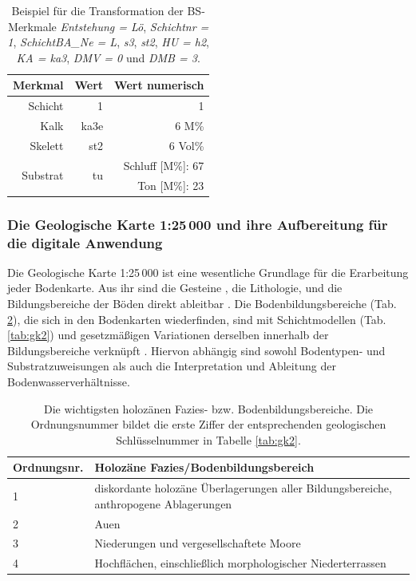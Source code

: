 \begin{table}[H]
  \centering
  \caption{Beispiel für die Transformation der BS-Merkmale  \textit{Entstehung = Lö}, \textit{Schichtnr = 1}, \textit{SchichtBA\_Ne = L}, \textit{s3}, \textit{st2}, \textit{HU = h2}, \textit{KA = ka3}, \textit{DMV = 0} und \textit{DMB = 3}.}\label{tab:trans-bs}
	\vspace*{6pt}
    \begin{tabular}{r|r|r}
    \toprule
    \textbf{Merkmal} & \textbf{Wert} & \textbf{Wert numerisch} \\
    \midrule
    Schicht & 1     & 1 \\\midrule
    Kalk  & ka3e  & 6 M\% \\\midrule
    Skelett & st2   & 6 Vol\% \\\midrule
    \multirow{2}[2]{*}{Substrat} & \multirow{2}[2]{*}{tu} & Schluff [M\%]: 67 \\
          &       & Ton [M\%]: 23 \\
    \bottomrule
    \end{tabular}%
  \label{tab:addlabel}%
\end{table}%


\subsubsection{Die Geologische Karte 1:25\,000 und ihre Aufbereitung für die digitale Anwendung}\label{sec:trans-gk}
Die Geologische Karte 1:25\,000 ist eine wesentliche Grundlage für die Erarbeitung jeder Bodenkarte. Aus ihr sind die Gesteine , die Lithologie, und die Bildungsbereiche der Böden  direkt ableitbar \citep{Kainz2006}. Die Bodenbildungsbereiche (Tab. \ref{tab:gk1}), die sich in den Bodenkarten wiederfinden, sind mit Schichtmodellen (Tab. \ref{tab:gk2}) und gesetzmäßigen Variationen derselben innerhalb der Bildungsbereiche verknüpft \citep{Kainz2006}. Hiervon abhängig sind sowohl Bodentypen- und Substratzuweisungen als auch die Interpretation und Ableitung der Bodenwasserverhältnisse.

\begin{table}[p]
\caption[Die wichtigsten holozänen Fazies- bzw. Bodenbildungsbereiche.]{Die wichtigsten holozänen Fazies- bzw. Bodenbildungsbereiche. Die Ordnungsnummer bildet die erste Ziffer der entsprechenden geologischen Schlüsselnummer in Tabelle \ref{tab:gk2}.}\label{tab:gk1}
\vspace*{3pt}
\begin{tabularx}{\textwidth}{lX}\toprule
\textbf{Ordnungsnr.}	& \textbf{Holozäne Fazies/Bodenbildungsbereich}\\\midrule
1 & 	diskordante holozäne Überlagerungen aller Bildungsbereiche, 
anthropogene Ablagerungen\\\midrule
2	& Auen\\\midrule
3	& Niederungen und vergesellschaftete Moore\\\midrule
4	& Hochflächen, einschließlich morphologischer Niederterrassen\\\bottomrule
\end{tabularx}
\end{table}

